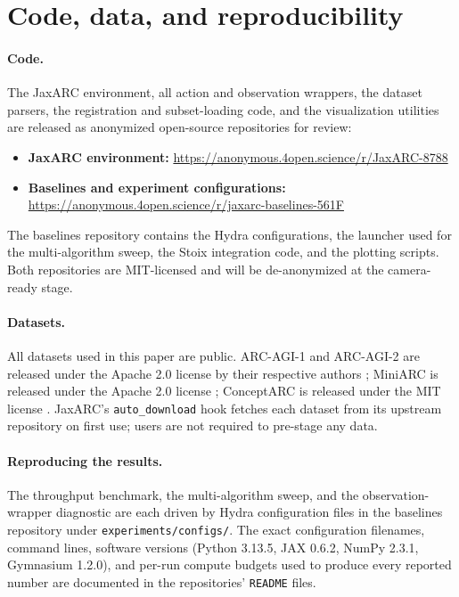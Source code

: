 \section{Code, data, and reproducibility}
\label{app:code_and_data}

\paragraph{Code.} The JaxARC environment, all action and observation wrappers, the dataset parsers, the registration and subset-loading code, and the visualization utilities are released as anonymized open-source repositories for review:

\begin{itemize}
    \item \textbf{JaxARC environment:} \url{https://anonymous.4open.science/r/JaxARC-8788}
    \item \textbf{Baselines and experiment configurations:} \url{https://anonymous.4open.science/r/jaxarc-baselines-561F}
\end{itemize}

The baselines repository contains the Hydra configurations, the launcher used for the multi-algorithm sweep, the Stoix integration code, and the plotting scripts. Both repositories are MIT-licensed and will be de-anonymized at the camera-ready stage.

\paragraph{Datasets.} All datasets used in this paper are public. ARC-AGI-1 and ARC-AGI-2 are released under the Apache 2.0 license by their respective authors \citep{cholletMeasureIntelligence2019,cholletARCAGI2NewChallenge2025}; MiniARC is released under the Apache 2.0 license \citep{kimPlaygroundsAbstractionReasoning2022}; ConceptARC is released under the MIT license \citep{moskvichevConceptARCBenchmarkEvaluating2023}. JaxARC's \texttt{auto\_download} hook fetches each dataset from its upstream repository on first use; users are not required to pre-stage any data.

\paragraph{Reproducing the results.} The throughput benchmark, the multi-algorithm sweep, and the observation-wrapper diagnostic are each driven by Hydra configuration files in the baselines repository under \texttt{experiments/configs/}. The exact configuration filenames, command lines, software versions (Python 3.13.5, JAX 0.6.2, NumPy 2.3.1, Gymnasium 1.2.0), and per-run compute budgets used to produce every reported number are documented in the repositories' \texttt{README} files.

